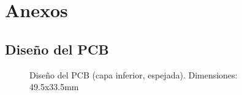 \chapter{Anexos}
\label{sec:anexos}

\section{Diseño del PCB}

\begin{figure}[!ht]
  \centering
  
  \caption{Diseño del PCB (capa inferior, espejada). Dimensiones: 49.5x33.5mm}
\end{figure}

